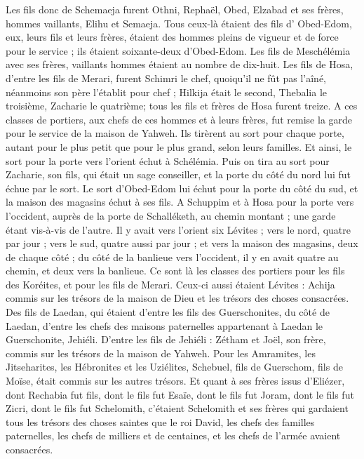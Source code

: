 \begin{multicols}{2}
Les fils donc de Schemaeja furent Othni, Rephaël, Obed, Elzabad et ses frères, hommes vaillants, Elihu et Semaeja.
Tous ceux-là étaient des fils d' Obed-Edom, eux, leurs fils et leurs frères, étaient des hommes pleins de vigueur et de force pour le service ; ils étaient soixante-deux d'Obed-Edom.
Les fils de Meschélémia avec ses frères, vaillants hommes étaient au nombre de dix-huit.
Les fils de Hosa, d'entre les fils de Merari, furent  Schimri le chef, quoiqu'il ne fût pas l'aîné, néanmoins son père l'établit pour chef ;
Hilkija était le second, Thebalia le troisième, Zacharie le quatrième; tous les fils et frères de Hosa furent treize.
A ces classes de portiers, aux chefs de ces hommes et à leurs frères, fut remise la garde pour le service de la maison de Yahweh.
Ils tirèrent au sort pour chaque porte, autant pour le plus petit que pour le plus grand, selon leurs familles.
Et ainsi, le sort pour la porte vers l'orient échut à Schélémia. Puis on tira au sort pour Zacharie, son fils, qui était un sage conseiller, et la porte du côté du nord lui fut échue par le sort.
Le sort d'Obed-Edom lui échut pour la porte du côté du sud, et la maison des magasins échut à ses fils.
A Schuppim et à Hosa pour la porte vers l'occident, auprès de la porte de Schalléketh, au chemin montant ; une garde étant vis-à-vis de l'autre.
Il y avait vers l'orient six Lévites ; vers le nord, quatre par jour  ; vers le sud, quatre aussi par jour ; et vers la maison des magasins, deux de chaque côté ;
du côté de la banlieue vers l'occident, il y en avait quatre au chemin, et deux vers la banlieue.
Ce sont là les classes des portiers pour les fils des Koréites, et pour les fils de Merari.
Ceux-ci aussi étaient Lévites : Achija commis sur les trésors de la maison de Dieu et les trésors des choses consacrées.
Des fils de Laedan, qui étaient d'entre les fils des Guerschonites, du côté de Laedan, d'entre les chefs des maisons paternelles appartenant à Laedan le Guerschonite, Jehiéli.
D'entre les fils de Jehiéli : Zétham et Joël, son frère, commis sur les trésors de la maison de Yahweh.
Pour les Amramites, les Jitseharites, les Hébronites et les  Uziélites,
Schebuel, fils de Guerschom, fils de Moïse, était commis sur les autres trésors.
Et quant à ses frères issus d'Eliézer, dont Rechabia fut fils, dont le fils fut Esaïe, dont le fils fut Joram, dont le fils fut  Zicri, dont le fils fut Schelomith,
c’étaient Schelomith et ses frères qui gardaient tous les trésors des choses saintes que le roi David, les chefs des familles paternelles, les chefs de milliers et de centaines, et les chefs de l'armée avaient consacrées.

\end{multicols}

